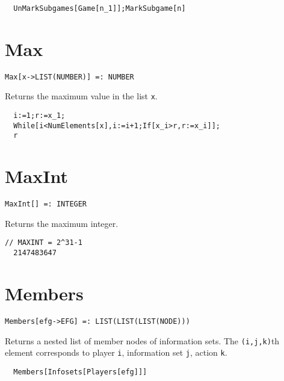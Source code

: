 \udfbody
\begin{verbatim}
  UnMarkSubgames[Game[n_1]];MarkSubgame[n]
\end{verbatim} 


\section*{Max}\label{ExtMax}
\begin{verbatim}
Max[x->LIST(NUMBER)] =: NUMBER 
\end{verbatim}

\noindent
Returns the maximum value in the list \verb+x+.  

\udfbody
\begin{verbatim}
  i:=1;r:=x_1;
  While[i<NumElements[x],i:=i+1;If[x_i>r,r:=x_i]];
  r
\end{verbatim} 


\section*{MaxInt}\label{ExtMaxInt}
\begin{verbatim}
MaxInt[] =: INTEGER 
\end{verbatim}

\noindent
Returns the maximum integer.

\udfbody
\begin{verbatim}
// MAXINT = 2^31-1
  2147483647
\end{verbatim} 


\section*{Members}\label{ExtMembers}
\begin{verbatim}
Members[efg->EFG] =: LIST(LIST(LIST(NODE))) 
\end{verbatim}

\noindent
Returns a nested list of member nodes of information sets.  The
\verb+(i,j,k)+th element corresponds to player \verb+i+, information
set \verb+j+, action \verb+k+.  

\udfbody
\begin{verbatim}
  Members[Infosets[Players[efg]]]
\end{verbatim} 

